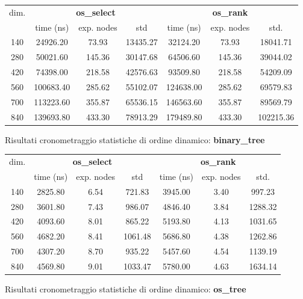 \documentclass{article}
\begin{document}
\begin{figure}[h]
    \caption{Risultati cronometraggio statistiche di ordine dinamico: \textbf{binary\_tree}}
        \begin{tabularx}{\textwidth}{ccccccc}
            \toprule
            \multirow{2}{*}{dim.} & \multicolumn{3}{c}{\textbf{os\_select}} & \multicolumn{3}{c}{\textbf{os\_rank}} \\
            \cmidrule(lr){2-4} \cmidrule(lr){5-7}
            & time (ns) & exp. nodes & std & time (ns) & exp. nodes & std. \\
            \midrule
140 & 24926.20 & 73.93 & 13435.27 & 32124.20 & 73.93 & 18041.71 \\
280 & 50021.60 & 145.36 & 30147.68 & 64506.60 & 145.36 & 39044.02 \\
420 & 74398.00 & 218.58 & 42576.63 & 93509.80 & 218.58 & 54209.09 \\
560 & 100683.40 & 285.62 & 55102.07 & 124638.00 & 285.62 & 69579.83 \\
700 & 113223.60 & 355.87 & 65536.15 & 146563.60 & 355.87 & 89569.79 \\
840 & 139693.80 & 433.30 & 78913.29 & 179489.80 & 433.30 & 102215.36 \\
            \bottomrule
        \end{tabularx}
\end{figure}

\begin{figure}[h]
     \caption{Risultati cronometraggio statistiche di ordine dinamico: \textbf{os\_tree}}
        \begin{tabularx}{\textwidth}{ccccccc}
            \toprule
            \multirow{2}{*}{dim.} & \multicolumn{3}{c}{\textbf{os\_select}} & \multicolumn{3}{c}{\textbf{os\_rank}} \\
            \cmidrule(lr){2-4} \cmidrule(lr){5-7}
            & time (ns) & exp. nodes & std & time (ns) & exp. nodes & std. \\
            \midrule
140 & 2825.80 & 6.54 & 721.83 & 3945.00 & 3.40 & 997.23 \\
280 & 3601.80 & 7.43 & 986.07 & 4846.40 & 3.84 & 1288.32 \\
420 & 4093.60 & 8.01 & 865.22 & 5193.80 & 4.13 & 1031.65 \\
560 & 4682.20 & 8.41 & 1061.48 & 5686.80 & 4.38 & 1262.86 \\
700 & 4307.20 & 8.70 & 935.22 & 5457.60 & 4.54 & 1139.19 \\
840 & 4569.80 & 9.01 & 1033.47 & 5780.00 & 4.63 & 1634.14 \\
            \bottomrule
        \end{tabularx}
\end{figure}
\end{document}
